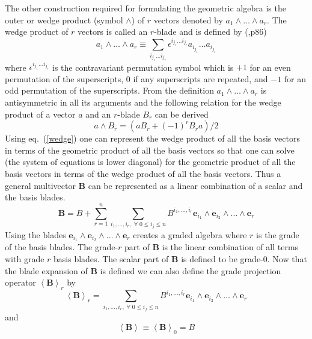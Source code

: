 \documentclass[12pt,twoside,openright]{memoir}
\newcommand{\bm}[1]{\boldsymbol{#1}}
\newcommand{\llt}{\left <}
\newcommand{\rgt}{\right >}
\newcommand{\W}{\wedge}
\newcommand{\proj}[2]{\llt {#1} \rgt_{#2}}
\newcommand{\eb}{\bm{e}}
\begin{document}
The other construction required for formulating the geometric algebra is the outer or wedge product (symbol $\W$) of $r$
vectors denoted by $a_{1}\W\dots\W a_{r}$.  The wedge product of $r$ vectors is called an $r$-blade and is defined
by (\cite{Doran},p86)
   \begin{equation}
      a_{1}\W\dots\W a_{r} \equiv \sum_{i_{j_{1}}\dots i_{j_{r}}} \epsilon^{i_{j_{1}}\dots i_{j_{r}}}a_{i_{j_{1}}}\dots a_{i_{j_{1}}}
   \end{equation}
where $\epsilon^{i_{j_{1}}\dots i_{j_{r}}}$ is the contravariant permutation symbol which is $+1$ for an even permutation of the
superscripts, $0$ if any superscripts are repeated, and $-1$ for an odd permutation of the superscripts. From the definition
$a_{1}\W\dots\W a_{r}$ is antisymmetric in all its arguments and the following relation for the wedge product of a vector $a$ and an
$r$-blade $B_{r}$ can be derived
   \begin{equation}\label{wedge}
      a\W B_{r} = (aB_{r}+(-1)^{r}B_{r}a)/2
   \end{equation}
Using eq.~(\ref{wedge}) one can represent the wedge product of all the basis vectors
in terms of the geometric product of all the basis vectors so that one can solve (the system
of equations is lower diagonal) for the geometric product of all the basis vectors in terms of
the wedge product of all the basis vectors.  Thus a general multivector $\bm{B}$ can be
represented as a linear combination of a scalar and the basis blades.
   \begin{equation}
      \bm{B} = B + \sum_{r=1}^{n}\sum_{i_{1},\dots,i_{r},\;\forall\; 0\le i_{j} \le n} B^{i_{1},\dots,i_{r}}\eb_{i_{1}}\W \eb_{i_{2}}\W\dots\W \eb_{r}
   \end{equation}
Using the blades $\eb_{i_{1}}\W \eb_{i_{2}}\W\dots\W \eb_{r}$ creates a graded
algebra where $r$ is the grade of the basis blades.  The grade-$r$
part of $\bm{B}$ is the linear combination of all terms with
grade $r$ basis blades. The scalar part of $\bm{B}$ is defined to
be grade-$0$.  Now that the blade expansion of $\bm{B}$ is defined
we can also define the grade projection operator $\proj{\bm{B}}{r}$ by
   \begin{equation}
      \proj{\bm{B}}{r} = \sum_{i_{1},\dots,i_{r},\;\forall\; 0\le i_{j} \le n} B^{i_{1},\dots,i_{r}}\eb_{i_{1}}\W \eb_{i_{2}}\W\dots\W \eb_{r}
   \end{equation}
and
   \begin{equation}
      \proj{\bm{B}}{} \equiv \proj{\bm{B}}{0} = B
   \end{equation}
\end{document}
